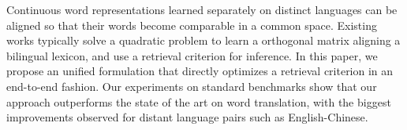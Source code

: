 Continuous word representations learned separately on distinct languages can be aligned so that their words become comparable in a common space. Existing works typically solve a quadratic problem to learn a orthogonal matrix aligning a bilingual lexicon, and use a retrieval criterion for inference. In this paper, we propose an unified formulation that directly optimizes a retrieval criterion in an end-to-end fashion. Our experiments on standard benchmarks show that our approach outperforms the state of the art on word translation, with the biggest improvements observed for distant language pairs such as English-Chinese.
